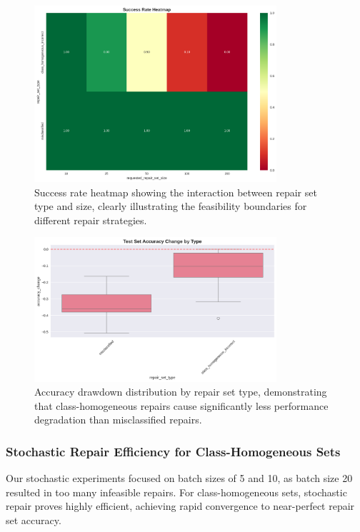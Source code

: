 \documentclass{article}
\begin{document}
\begin{description}
\begin{figure}[h]
	\centering
	\includegraphics[width=0.8\textwidth]{results/one_shot_analysis/success_rates/success_rate_heatmap.png}
	\caption{Success rate heatmap showing the interaction between repair set type and size, clearly illustrating the feasibility boundaries for different repair strategies.}
	\label{fig:success_rate_heatmap}
\end{figure}

\begin{figure}[h]
	\centering
	\includegraphics[width=0.8\textwidth]{results/one_shot_analysis/accuracy/accuracy_change_by_type.png}
	\caption{Accuracy drawdown distribution by repair set type, demonstrating that class-homogeneous repairs cause significantly less performance degradation than misclassified repairs.}
	\label{fig:accuracy_change_by_type}
\end{figure}

\subsubsection{Stochastic Repair Efficiency for Class-Homogeneous Sets}

Our stochastic experiments focused on batch sizes of 5 and 10, as batch size 20 resulted in too many infeasible repairs. For class-homogeneous sets, stochastic repair proves highly efficient, achieving rapid convergence to near-perfect repair set accuracy.


\end{description}
\end{document}
